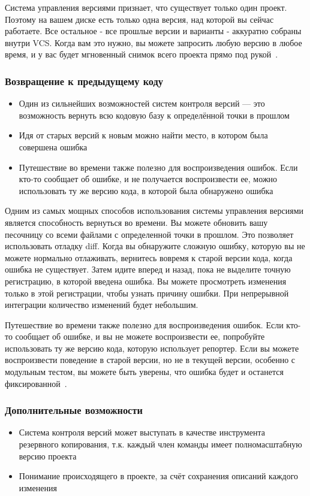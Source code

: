 \documentclass{../industrial-development}
\begin{document}
Система управления версиями признает, что существует только один проект. Поэтому на вашем диске есть только одна версия, над которой вы сейчас работаете. Все остальное - все прошлые версии и варианты - аккуратно собраны внутри VCS. Когда вам это нужно, вы можете запросить любую версию в любое время, и у вас будет мгновенный снимок всего проекта прямо под рукой~\cite{GitTower}.

\begin{frame} \frametitle{Возвращение к предыдущему коду}
  \begin{itemize}
  \item Один из сильнейших возможностей систем контроля версий --- это возможность вернуть всю кодовую базу к определённой точки в прошлом
  \item Идя от старых версий к новым можно найти место, в котором была совершена ошибка
  \item Путешествие во времени также полезно для воспроизведения ошибок. Если кто-то сообщает об ошибке, и не получается воспроизвести ее, можно использовать ту же версию кода, в которой была обнаружено ошибка
  \end{itemize}
\end{frame}

\lecturenotes

Одним из самых мощных способов использования системы управления версиями является способность вернуться во времени. Вы можете обновить вашу песочницу со всеми файлами с определенной точки в прошлом.
Это позволяет использовать отладку diff. Когда вы обнаружите сложную ошибку, которую вы не можете нормально отлаживать, вернитесь вовремя к старой версии кода, когда ошибка не существует. Затем идите вперед и назад, пока не выделите точную регистрацию, в которой введена ошибка. Вы можете просмотреть изменения только в этой регистрации, чтобы узнать причину ошибки. При непрерывной интеграции количество изменений будет небольшим.

Путешествие во времени также полезно для воспроизведения ошибок. Если кто-то сообщает об ошибке, и вы не можете воспроизвести ее, попробуйте использовать ту же версию кода, которую использует репортер. Если вы можете воспроизвести поведение в старой версии, но не в текущей версии, особенно с модульным тестом, вы можете быть уверены, что ошибка будет и останется фиксированной~\cite[171]{AgileDevelopment}.


\begin{frame} \frametitle{Дополнительные возможности}
  \begin{itemize}
  \item Система контроля версий может выступать в качестве инструмента резервного копирования, т.к. каждый член команды  имеет полномасштабную версию проекта
  \item Понимание происходящего в проекте, за счёт сохранения описаний каждого изменения
  \end{itemize}
\end{frame}
\end{document}

